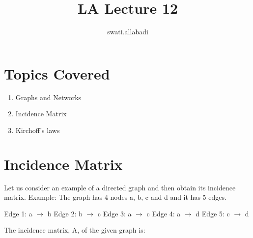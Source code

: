 \documentclass{article}
\title{LA Lecture 12}
\author{swati.allabadi }
\date{}
\begin{document}
\maketitle

\section{Topics Covered}
\begin{enumerate}
    \item Graphs and Networks
    \item Incidence Matrix
    \item Kirchoff's laws
\end{enumerate}

\section{Incidence Matrix}
Let us consider an example of a directed graph and then obtain its incidence  matrix. Example: The graph has 4 nodes a, b, c and d and it has 5 edges.
\newline

Edge 1: a $\rightarrow$ b
Edge 2: b $\rightarrow$ c
Edge 3: a $\rightarrow$ c
Edge 4: a $\rightarrow$ d
Edge 5: c $\rightarrow$ d

The incidence matrix, A, of the given graph is:
\end{document}
